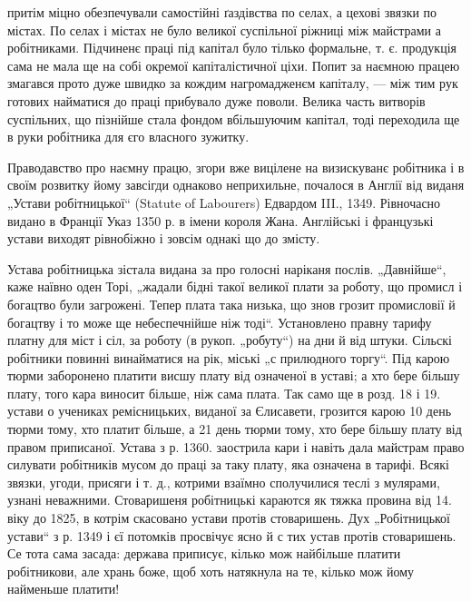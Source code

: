 \parcont{}
притім міцно обезпечували самостійні ґаздівства по селах,
а цехові звязки по містах. По селах і містах не було великої
суспільної ріжниці між майстрами а робітниками.
Підчиненє праці під капітал було тілько формальне, т. є.
продукція сама не мала ще на собі окремої капіталістичної
ціхи. Попит за наємною працею змагався прото дуже швидко
за кождим нагромадженєм капіталу, — між тим рук готових
найматися до праці прибувало дуже поволи. Велика
часть витворів суспільних, що пізнійше стала фондом вбільшуючим
капітал, тоді переходила ще в руки робітника для
єго власного зужитку.

Праводавство про наємну працю, згори вже вицілене
на визискуванє робітника і в своїм розвитку йому завсігди
однаково неприхильне, почалося в Англії від виданя „Устави
робітницької“ (Statute of Labourers) Едвардом III., 1349.
Рівночасно видано в Франції Указ 1350 р. в імени короля
Жана. Англійські і французькі устави виходят рівнобіжно
і зовсім однакі що до змісту.

Устава робітницька зістала видана за про голосні наріканя
послів. „Давнійше“, каже наївно оден Торі, „жадали
бідні такої великої плати за роботу, що промисл і богацтво
були загрожені. Тепер плата така низька, що знов грозит
промисловії й богацтву і то може ще небеспечнійше ніж
тоді“. Установлено правну тарифу платну для міст і сіл,
за роботу (в рукоп. „робуту“) на дни й від штуки. Сільскі робітники
повинні винайматися на рік, міські „с прилюдного
торгу“. Під карою тюрми заборонено платити висшу плату
від означеної в уставі; а хто бере більшу плату, того кара
виносит більше, ніж сама плата. Так само ще в розд. 18
і 19. устави о учениках ремісницьких, виданої за Єлисавети,
грозится карою 10 день тюрми тому, хто платит більше,
а 21 день тюрми тому, хто бере більшу плату від правом
приписаної. Устава з р. 1360. заострила кари і навіть дала
майстрам право силувати робітників мусом до праці за таку
плату, яка означена в тарифі. Всякі звязки, угоди, присяги
і т. д., котрими взаїмно сполучилися теслі з мулярами,
узнані неважними. Стоваришеня робітницькі караются як
тяжка провина від 14. віку до 1825, в котрім скасовано
устави протів стоваришень. Дух „Робітницької устави“ з р.
1349 і єї потомків просвічує ясно й с тих устав протів стоваришень.
Се тота сама засада: держава приписує, кілько
мож найбільше платити робітникови, але хрань боже, щоб
хоть натякнула на те, кілько мож йому найменьше платити!


